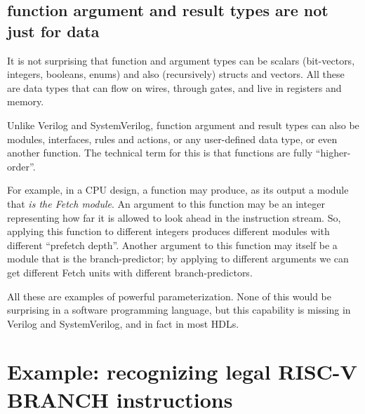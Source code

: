 
\subsection{{\BSV} function argument and result types are not just for data}


It is not surprising that {\BSV} function and argument types can be
scalars (bit-vectors, integers, booleans, enums) and also
(recursively) structs and vectors.  All these are data types that can
flow on wires, through gates, and live in registers and memory.

Unlike Verilog and SystemVerilog, {\BSV} function argument and result
types can also be modules, interfaces, rules and actions, or any
user-defined data type, or even another function.  The technical term
for this is that {\BSV} functions are fully ``higher-order''.

For example, in a CPU design, a {\BSV} function may produce, as its
output a module that \emph{is the Fetch module}.  An argument to this
function may be an integer representing how far it is allowed to look
ahead in the instruction stream.  So, applying this function to
different integers produces different modules with different
``prefetch depth''.  Another argument to this function may itself be a
module that is the branch-predictor; by applying to different
arguments we can get different Fetch units with different
branch-predictors.

All these are examples of powerful parameterization.  None of this
would be surprising in a software programming language, but this
capability is missing in Verilog and SystemVerilog, and in fact in
most HDLs.


\section{Example: recognizing legal RISC-V BRANCH instructions}

